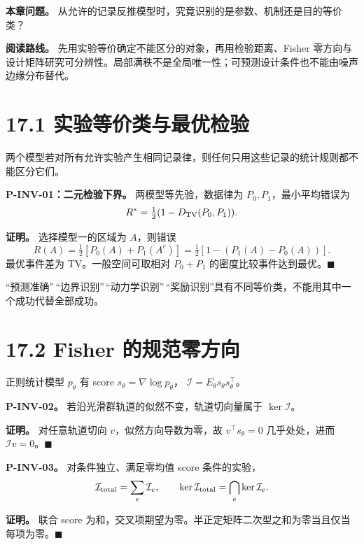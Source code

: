 \documentclass[
  11pt,
  oneside]{book}
\begin{document}
\textbf{本章问题。} 从允许的记录反推模型时，究竟识别的是参数、机制还是目的等价类？

\textbf{阅读路线。} 先用实验等价确定不能区分的对象，再用检验距离、Fisher 零方向与设计矩阵研究可分辨性。局部满秩不是全局唯一性；可预测设计条件也不能由噪声边缘分布替代。

\section{17.1 实验等价类与最优检验}\label{ux5b9eux9a8cux7b49ux4ef7ux7c7bux4e0eux6700ux4f18ux68c0ux9a8c}

两个模型若对所有允许实验产生相同记录律，则任何只用这些记录的统计规则都不能区分它们。

\hypertarget{p-inv-01}{}\label{p-inv-01}

\textbf{P-INV-01：二元检验下界。} 两模型等先验，数据律为 \(P_0,P_1\)，最小平均错误为 \[R^*=\tfrac12(1-D_{\rm TV}(P_0,P_1)).\]

\textbf{证明。} 选择模型一的区域为 \(A\)，则错误 \[R(A)=\tfrac12[P_0(A)+P_1(A^c)]
=\tfrac12[1-(P_1(A)-P_0(A))].\] 最优事件差为 TV。一般空间可取相对 \(P_0+P_1\) 的密度比较事件达到最优。\(\blacksquare\)

``预测准确''\,``边界识别''\,``动力学识别''\,``奖励识别''具有不同等价类，不能用其中一个成功代替全部成功。

\section{17.2 Fisher 的规范零方向}\label{fisher-ux7684ux89c4ux8303ux96f6ux65b9ux5411}

正则统计模型 \(p_\theta\) 有 score \(s_\theta=\nabla\log p_\theta\)， \(\mathcal I=E_\theta s_\theta s_\theta^\top\)。

\hypertarget{p-inv-02}{}\label{p-inv-02}

\textbf{P-INV-02。} 若沿光滑群轨道的似然不变，轨道切向量属于 \(\ker\mathcal I\)。

\textbf{证明。} 对任意轨道切向 \(v\)，似然方向导数为零，故 \(v^\top s_\theta=0\) 几乎处处，进而 \(\mathcal I v=0\)。\(\blacksquare\)

\hypertarget{p-inv-03}{}\label{p-inv-03}

\textbf{P-INV-03。} 对条件独立、满足零均值 score 条件的实验， \[\mathcal I_{\rm total}=\sum_e\mathcal I_e,\qquad
\ker\mathcal I_{\rm total}=\bigcap_e\ker\mathcal I_e.\]

\textbf{证明。} 联合 score 为和，交叉项期望为零。半正定矩阵二次型之和为零当且仅当每项为零。\(\blacksquare\)
\end{document}
